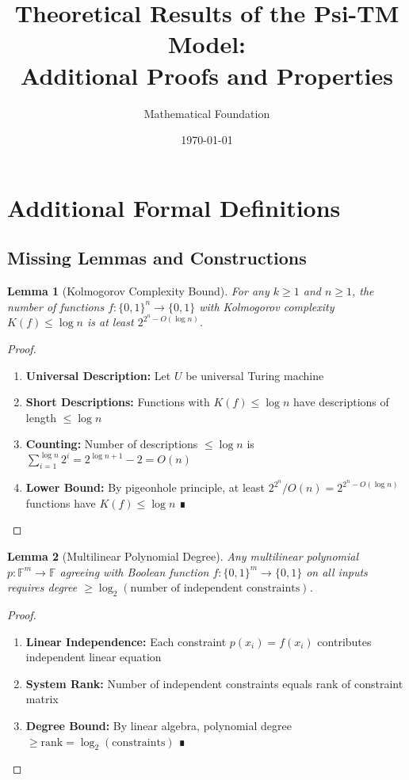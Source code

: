\documentclass[11pt]{article}
\title{Theoretical Results of the Psi-TM Model:\\
Additional Proofs and Properties}
\author{Mathematical Foundation}
\date{\today}
\newtheorem{lemma}{Lemma}
\begin{document}
\maketitle

\section{Additional Formal Definitions}

\subsection{Missing Lemmas and Constructions}

\begin{lemma}[Kolmogorov Complexity Bound]
For any $k \geq 1$ and $n \geq 1$, the number of functions $f: \{0,1\}^n \to \{0,1\}$ with Kolmogorov complexity $K(f) \leq \log n$ is at least $2^{2^n - O(\log n)}$.
\end{lemma}

\begin{proof}
\begin{enumerate}
\item \textbf{Universal Description:} Let $U$ be universal Turing machine
\item \textbf{Short Descriptions:} Functions with $K(f) \leq \log n$ have descriptions of length $\leq \log n$
\item \textbf{Counting:} Number of descriptions $\leq \log n$ is $\sum_{i=1}^{\log n} 2^i = 2^{\log n + 1} - 2 = O(n)$
\item \textbf{Lower Bound:} By pigeonhole principle, at least $2^{2^n}/O(n) = 2^{2^n - O(\log n)}$ functions have $K(f) \leq \log n$ ∎
\end{enumerate}
\end{proof}

\begin{lemma}[Multilinear Polynomial Degree]
Any multilinear polynomial $p: \mathbb{F}^m \to \mathbb{F}$ agreeing with Boolean function $f: \{0,1\}^m \to \{0,1\}$ on all inputs requires degree $\geq \log_2(\text{number of independent constraints})$.
\end{lemma}

\begin{proof}
\begin{enumerate}
\item \textbf{Linear Independence:} Each constraint $p(x_i) = f(x_i)$ contributes independent linear equation
\item \textbf{System Rank:} Number of independent constraints equals rank of constraint matrix
\item \textbf{Degree Bound:} By linear algebra, polynomial degree $\geq \text{rank} = \log_2(\text{constraints})$ ∎
\end{enumerate}
\end{proof}
\end{document}
